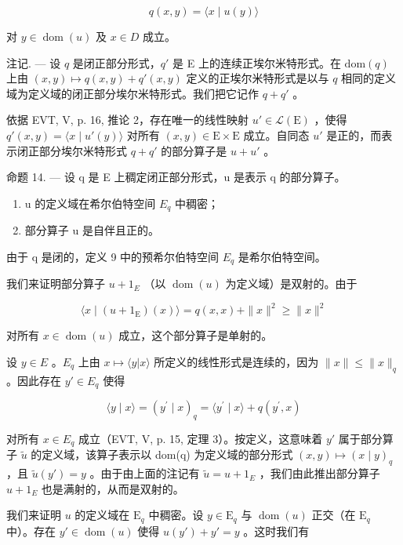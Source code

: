 \[
q (x, y) = \langle x \mid u (y) \rangle
\]

对 \(y \in \operatorname{dom}(u)\) 及 \(x \in D\) 成立。

注记. --- 设 \(q\) 是闭正部分形式，\(q'\) 是 E 上的连续正埃尔米特形式。在 \(\text{dom}(q)\) 上由 \((x, y) \mapsto q(x, y) + q'(x, y)\) 定义的正埃尔米特形式是以与 \(q\) 相同的定义域为定义域的闭正部分埃尔米特形式。我们把它记作 \(q + q'\) 。

依据 EVT, V, p. 16, 推论 2，存在唯一的线性映射 \(u' \in \mathcal{L}(\mathrm{E})\) ，使得 \(q'(x,y) = \langle x \mid u'(y) \rangle\) 对所有 \((x,y) \in \mathrm{E} \times \mathrm{E}\) 成立。自同态 \(u'\) 是正的，而表示闭正部分埃尔米特形式 \(q + q'\) 的部分算子是 \(u + u'\) 。

命题 14. --- 设 q 是 E 上稠定闭正部分形式，u 是表示 q 的部分算子。

\begin{enumerate}
\def\labelenumi{\alph{enumi})}
\item
  u 的定义域在希尔伯特空间 \(E_{q}\) 中稠密；
\item
  部分算子 u 是自伴且正的。
\end{enumerate}

由于 q 是闭的，定义 9 中的预希尔伯特空间 \(E_{q}\) 是希尔伯特空间。

我们来证明部分算子 \(u + 1_{E}\) （以 \(\operatorname{dom}(u)\) 为定义域）是双射的。由于

\[
\langle x \mid (u + 1 _ {\mathrm{E}}) (x) \rangle = q (x, x) + \| x \| ^ {2} \geqslant \| x \| ^ {2}
\]

对所有 \(x \in \operatorname{dom}(u)\) 成立，这个部分算子是单射的。

设 \(y \in E\) 。\(E_{q}\) 上由 \(x \mapsto \langle y | x \rangle\) 所定义的线性形式是连续的，因为 \(\|x\| \leqslant \|x\|_{q}\) 。因此存在 \(y' \in E_{q}\) 使得

\[
\langle y \mid x \rangle = (y ^ {\prime} \mid x) _ {q} = \langle y ^ {\prime} \mid x \rangle + q (y ^ {\prime}, x)
\]

对所有 \(x \in E_{q}\) 成立（EVT, V, p. 15, 定理 3）。按定义，这意味着 \(y'\) 属于部分算子 \(\widetilde{u}\) 的定义域，该算子表示以 dom(q) 为定义域的部分形式 \((x, y) \mapsto (x \mid y)_{q}\) ，且 \(\widetilde{u}(y') = y\) 。由于由上面的注记有 \(\widetilde{u} = u + 1_{E}\) ，我们由此推出部分算子 \(u + 1_{E}\) 也是满射的，从而是双射的。

我们来证明 \(u\) 的定义域在 \(\mathrm{E}_q\) 中稠密。设 \(y \in \mathrm{E}_q\) 与 \(\operatorname{dom}(u)\) 正交（在 \(\mathrm{E}_q\) 中）。存在 \(y' \in \operatorname{dom}(u)\) 使得 \(u(y') + y' = y\) 。这时我们有

